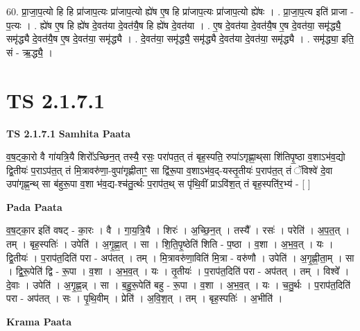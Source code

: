 \documentclass[17pt]{extarticle}
\begin{document}
60. प्रा॒जा॒प॒त्यो हि हि प्रा॑जाप॒त्यः प्रा॑जाप॒त्यो ह्ये॑ष ए॒ष हि प्रा॑जाप॒त्यः प्रा॑जाप॒त्यो ह्ये॑षः । . प्रा॒जा॒प॒त्य इति॑ प्राजा - प॒त्यः । . ह्ये॑ष ए॒ष हि ह्ये॑ष दे॒वत॑या दे॒वत॑यै॒ष हि ह्ये॑ष दे॒वत॑या । . ए॒ष दे॒वत॑या दे॒वत॑यै॒ष ए॒ष दे॒वत॑या॒ समृ॑द्ध्यै॒ समृ॑द्ध्यै दे॒वत॑यै॒ष ए॒ष दे॒वत॑या॒ समृ॑द्ध्यै । . दे॒वत॑या॒ समृ॑द्ध्यै॒ समृ॑द्ध्यै दे॒वत॑या दे॒वत॑या॒ समृ॑द्ध्यै । . समृ॑द्ध्या॒ इति॒ सं - ऋ॒द्ध्यै॒ । \newline
\pagebreak
{}

\section{ TS 2.1.7.1 }

\textbf{TS 2.1.7.1 } \newline
\textbf{Samhita Paata} \newline

व॒ष॒ट्का॒रो वै गा॑यत्रि॒यै शिरो᳚ऽच्छिन॒त् तस्यै॒ रसः॒ परा॑पत॒त् तं बृह॒स्पति॒ रुपा॑ऽगृह्णा॒थ्‌सा शि॑तिपृ॒ष्ठा व॒शाऽभ॑व॒द्यो द्वि॒तीयः॑ प॒राऽप॑त॒त् तं मि॒त्रावरु॑णा॒-वुपा॑गृह्णीताꣳ॒॒ सा द्वि॑रू॒पा व॒शाऽभ॑व॒द्-यस्तृ॒तीयः॑ प॒राप॑त॒त् तं ॅविश्वे॑ दे॒वा उपा॑गृह्ण॒न्थ् सा ब॑हुरू॒पा व॒शा भ॑व॒द्य-श्च॑तु॒र्त्थः प॒राप॑त॒थ् स पृ॑थि॒वीं प्राऽवि॑श॒त् तं बृह॒स्पति॑र॒भ्य॑ - [  ] \newline

\textbf{Pada Paata} \newline

व॒ष॒ट्का॒र इति॑ वषट् - का॒रः । वै । गा॒य॒त्रि॒यै । शिरः॑ । अ॒च्छि॒न॒त् । तस्यै᳚ । रसः॑ । परेति॑ । अ॒प॒त॒त् । तम् । बृह॒स्पतिः॑ । उपेति॑ । अ॒गृ॒ह्णा॒त् । सा । शि॒ति॒पृ॒ष्ठेति॑ शिति - प॒ष्ठा । व॒शा । अ॒भ॒व॒त् । यः । द्वि॒तीयः॑ । प॒राप॑त॒दिति॑ परा - अप॑तत् । तम् । मि॒त्रावरु॑णा॒विति॑ मि॒त्रा - वरु॑णौ । उपेति॑ । अ॒गृ॒ह्णी॒ता॒म् । सा । द्वि॒रू॒पेति॑ द्वि - रू॒पा । व॒शा । अ॒भ॒व॒त् । यः । तृ॒तीयः॑ । प॒राप॑त॒दिति॑ परा - अप॑तत् । तम् । विश्वे᳚ । दे॒वाः । उपेति॑ । अ॒गृ॒ह्ण॒न्न् । सा । ब॒हु॒रू॒पेति॑ बहु - रू॒पा । व॒शा । अ॒भ॒व॒त् । यः । च॒तु॒र्थः । प॒राप॑त॒दिति॑ परा - अप॑तत् । सः । पृ॒थि॒वीम् । प्रेति॑ । अ॒वि॒श॒त् । तम् । बृह॒स्पतिः॑ । अ॒भीति॑ ।  \newline


\textbf{Krama Paata} \newline
\end{document}
